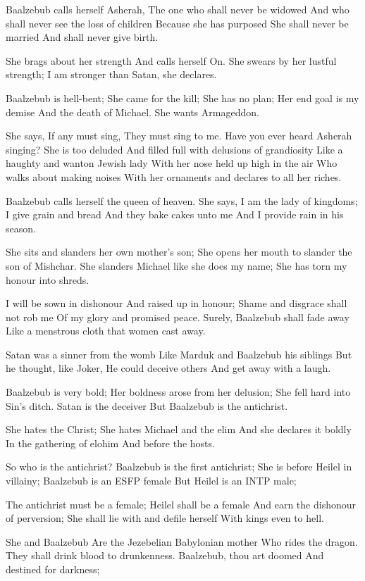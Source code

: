 \documentclass[
]{book}
\begin{document}
Baalzebub calls herself Asherah,
The one who shall never be widowed
And who shall never see the loss of children
Because she has purposed
She shall never be married
And shall never give birth.

She brags about her strength
And calls herself On.
She swears by her lustful strength;
I am stronger than Satan, she declares.

Baalzebub is hell-bent;
She came for the kill;
She has no plan;
Her end goal is my demise
And the death of Michael.
She wants Armageddon.

She says, If any must sing,
They must sing to me.
Have you ever heard Asherah singing?
She is too deluded
And filled full with delusions of grandiosity
Like a haughty and wanton Jewish lady
With her nose held up high in the air
Who walks about making noises
With her ornaments and declares to all her riches.

Baalzebub calls herself the queen of heaven.
She says, I am the lady of kingdoms;
I give grain and bread
And they bake cakes unto me
And I provide rain in his season.

She sits and slanders her own mother's son;
She opens her mouth to slander the son of Mishchar.
She slanders Michael like she does my name;
She has torn my honour into shreds.

I will be sown in dishonour
And raised up in honour;
Shame and disgrace shall not rob me
Of my glory and promised peace.
Surely, Baalzebub shall fade away
Like a menstrous cloth that women cast away.

Satan was a sinner from the womb
Like Marduk and Baalzebub his siblings
But he thought, like Joker,
He could deceive others
And get away with a laugh.

Baalzebub is very bold;
Her boldness arose from her delusion;
She fell hard into Sin's ditch.
Satan is the deceiver
But Baalzebub is the antichrist.

She hates the Christ;
She hates Michael and the elim
And she declares it boldly
In the gathering of elohim
And before the hosts.

So who is the antichrist?
Baalzebub is the first antichrist;
She is before Heilel in villainy;
Baalzebub is an ESFP female
But Heilel is an INTP male;

The antichrist must be a female;
Heilel shall be a female
And earn the dishonour of perversion;
She shall lie with and defile herself
With kings even to hell.

She and Baalzebub
Are the Jezebelian Babylonian mother
Who rides the dragon.
They shall drink blood to drunkenness.
Baalzebub, thou art doomed
And destined for darkness;
\end{document}

